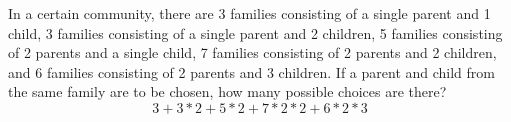 \item In a certain community, there are 3 families consisting of a single parent and 1 child, 3 families consisting of a single parent and 2 children, 5 families consisting of 2 parents and a single child, 7 families consisting of 2 parents and 2 children, and 6 families consisting of 2 parents and 3 children. If a parent and child from the same family are to be chosen, how many possible choices are there?
\[ 3 + 3 * 2 + 5 * 2 + 7 * 2 * 2 + 6 * 2 * 3 \]